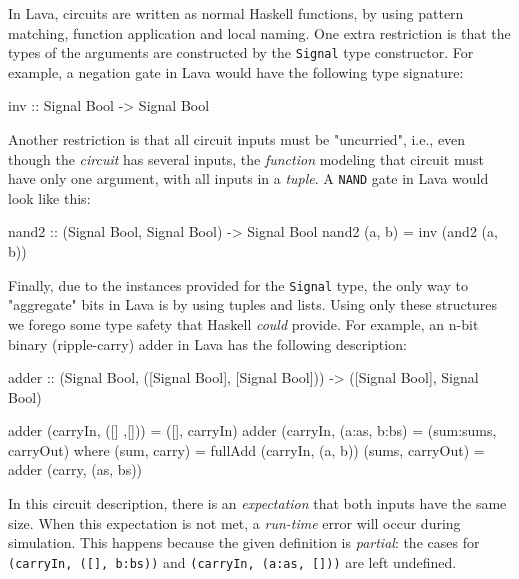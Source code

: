             In Lava, circuits are written as normal Haskell functions, by using pattern matching,
            function application and local naming.
            One extra restriction is that the types of the arguments are
            constructed by the \texttt{Signal} type constructor.
            For example, a negation gate in Lava would have the following type signature:

            \begin{haskellcode}
        inv :: Signal Bool -> Signal Bool
            \end{haskellcode}

            Another restriction is that all circuit inputs must be "uncurried", i.e.,
            even though the \emph{circuit} has several inputs, the \emph{function} modeling that circuit
            must have only one argument, with all inputs in a \emph{tuple}.
            A \texttt{NAND} gate in Lava would look like this:

            \begin{haskellcode}
        nand2 :: (Signal Bool, Signal Bool) -> Signal Bool
        nand2 (a, b) = inv (and2 (a, b))
            \end{haskellcode}

            Finally, due to the instances provided for the \texttt{Signal} type, the only way to
            "aggregate" bits in Lava is by using tuples and lists.
            Using only these structures we forego some type safety that Haskell \emph{could} provide.
            For example, an n-bit binary (ripple-carry) adder in Lava has the following description:

            \begin{haskellcode}
        adder :: (Signal Bool, ([Signal Bool], [Signal Bool]))
              -> ([Signal Bool], Signal Bool)

        adder (carryIn, ([] ,[]))    = ([], carryIn)
        adder (carryIn, (a:as, b:bs) = (sum:sums, carryOut)
            where (sum, carry)     = fullAdd (carryIn, (a, b))
                  (sums, carryOut) = adder (carry, (as, bs))
            \end{haskellcode}

            In this circuit description, there is an \emph{expectation} that both inputs have the same size.
            When this expectation is not met, a \emph{run-time} error will occur during simulation.
            This happens because the given definition is \emph{partial}:
            the cases for \texttt{(carryIn, ([], b:bs))} and \texttt{(carryIn, (a:as, []))} are left undefined.

